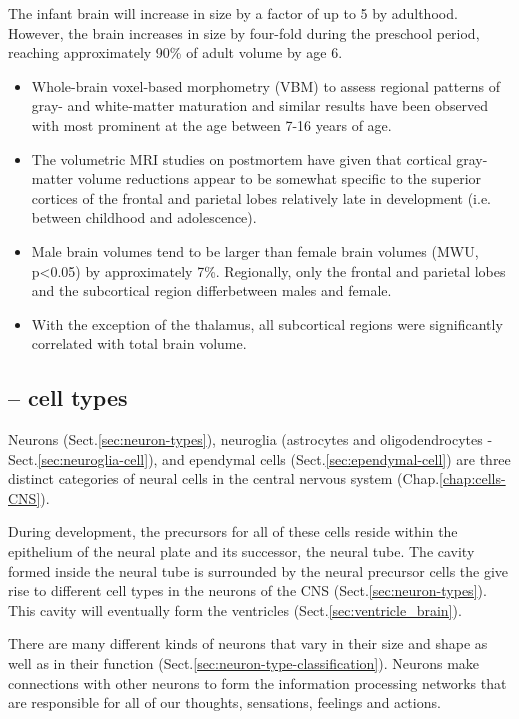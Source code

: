 The infant brain will increase in size by a factor of up to 5 by adulthood.
However, the brain increases in size by four-fold during the preschool period,
reaching approximately 90\% of adult volume by age 6. 
\begin{itemize}
  \item  Whole-brain voxel-based morphometry (VBM) to assess regional patterns of gray-
and white-matter maturation and similar results have been observed with most
prominent at the age between 7-16 years of age.
  \item The volumetric MRI studies on postmortem have given that cortical gray-matter
volume reductions appear to be somewhat specific to the superior cortices of the
frontal and parietal lobes relatively late in development (i.e. between
childhood and adolescence).

  \item Male brain volumes tend to be larger than female brain volumes (MWU, p<0.05) by
approximately 7\%. Regionally, only the frontal and parietal lobes and the
subcortical region differbetween males and female.

  \item With the exception of the thalamus, all subcortical regions were significantly
correlated with total brain volume.
\end{itemize}

\subsection{-- cell types}
\label{sec:brain-cells}

Neurons (Sect.\ref{sec:neuron-types}), neuroglia (astrocytes and
oligodendrocytes - Sect.\ref{sec:neuroglia-cell}), and ependymal cells
(Sect.\ref{sec:ependymal-cell}) are three distinct categories of neural cells in
the central nervous system (Chap.\ref{chap:cells-CNS}).

During development, the precursors for all of these cells reside within the
epithelium of the neural plate and its successor, the neural tube. The cavity
formed inside the neural tube is surrounded by the neural precursor cells the
give rise to different cell types in the neurons of the CNS
(Sect.\ref{sec:neuron-types}). This cavity will eventually form the ventricles
(Sect.\ref{sec:ventricle_brain}).

There are many different kinds of neurons that vary in their size and shape as
well as in their function (Sect.\ref{sec:neuron-type-classification}). Neurons
make connections with other neurons to form the information processing networks
that are responsible for all of our thoughts, sensations, feelings and actions.


